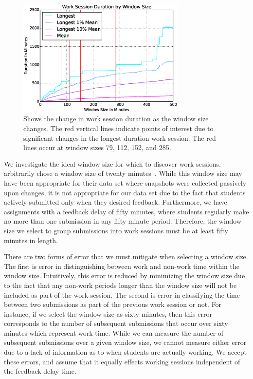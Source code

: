 \begin{figure}[!t]
\centering \includegraphics[width=3.3in]{graphs/Work_Session_Duration_by_Window_Size.eps}
\caption{Shows the change in work session duration as the window size
  changes. The red vertical lines indicate points of interest due to
  significant changes in the longest duration work session. The red lines occur
  at window sizes 79, 112, 152, and 285.}
\end{figure}

We investigate the ideal window size for which to discover work
sessions. \spacco{} arbitrarily chose a window size of twenty
minutes~\cite{Spacco:2013:TIP:2462476.2465594}. While this window size may have
been appropriate for their data set where snapshots were collected passively
upon changes, it is not appropriate for our data set due to the fact that
students actively submitted only when they desired feedback. Furthermore, we
have assignments with a feedback delay of fifty minutes, where students
regularly make no more than one submission in any fifty minute
period. Therefore, the window size we select to group submissions into work
sessions must be at least fifty minutes in length.

There are two forms of error that we must mitigate when selecting a window
size. The first is error in distinguishing between work and non-work time
within the window size. Intuitively, this error is reduced by minimizing the
window size due to the fact that any non-work periods longer than the window
size will not be included as part of the work session. The second is error in
classifying the time between two submissions as part of the previous work
session or not. For instance, if we select the window size as sixty minutes,
then this error corresponds to the number of subsequent submissions that occur
over sixty minutes which represent work time. While we can measure the number
of subsequent submissions over a given window size, we cannot measure either
error due to a lack of information as to when students are actually working. We
accept these errors, and assume that it equally effects working sessions
independent of the feedback delay time.

